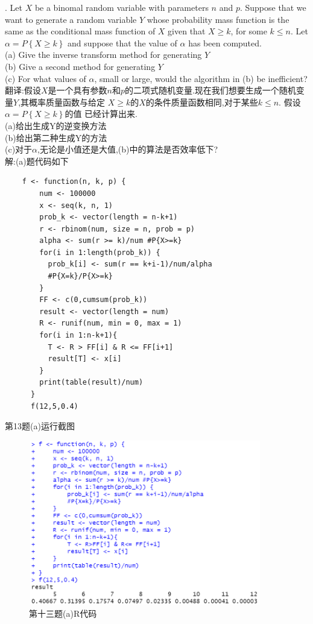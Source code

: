 \documentclass{book}
\begin{document}
. Let $X$ be a binomal random variable with parameters $n$ and $p$. Suppose that we
want to generate a random variable $Y$ whose probability mass function is the same
as the conditional mass function of $X$ given that $X \geq k$, for some $k \leq n$. Let
$\alpha = P\left\{X \geq k\right\}$ and suppose that the value of $\alpha$ has been computed. \\
(a) Give the inverse transform method for generating $Y$ \\
(b) Give a second method for generating $Y$ \\
(c) For what values of $\alpha$, small or large, would the algorithm in (b) be inefficient? \\
\noindent
翻译:假设$X$是一个具有参数$n$和$p$的二项式随机变量.现在我们想要生成一个随机变量$Y$,其概率质量函数与给定
$X \geq k$的$X$的条件质量函数相同,对于某些$k \leq n$. 假设$\alpha = P\left\{X \geq k\right\}$的值
已经计算出来. \\
(a)给出生成Y的逆变换方法 \\
(b)给出第二种生成Y的方法 \\
(c)对于$\alpha$,无论是小值还是大值,(b)中的算法是否效率低下? \\
解:(a)题代码如下 \\
\lstset{language = R}
\begin{lstlisting}
    f <- function(n, k, p) {
        num <- 100000
        x <- seq(k, n, 1) 
        prob_k <- vector(length = n-k+1)
        r <- rbinom(num, size = n, prob = p)
        alpha <- sum(r >= k)/num #P{X>=k}
        for(i in 1:length(prob_k)) {
          prob_k[i] <- sum(r == k+i-1)/num/alpha
          #P{X=k}/P{X>=k}
        }
        FF <- c(0,cumsum(prob_k))
        result <- vector(length = num) 
        R <- runif(num, min = 0, max = 1)
        for(i in 1:n-k+1){  
          T <- R > FF[i] & R <= FF[i+1]  
          result[T] <- x[i]
        }
        print(table(result)/num)
      }
      f(12,5,0.4)
\end{lstlisting}
第13题(a)运行截图
\begin{figure}[H]
  \centering
  \includegraphics*[height = 7.2cm, width = 10.2cm]{gramFile/第十三题(a)运行截图.PNG}
  \caption{第十三题(a)R代码}
\end{figure}
\end{document}
